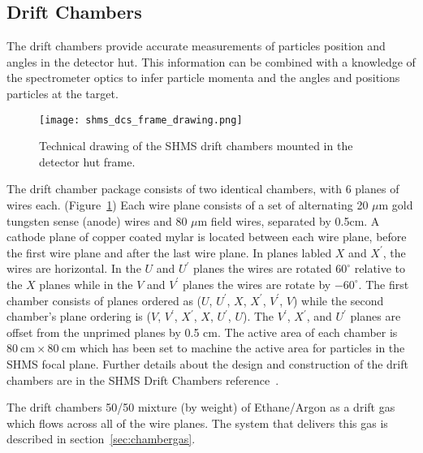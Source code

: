 

\subsection{Drift Chambers}
\label{sec:shmschambers}
The drift chambers provide accurate measurements of particles position
and angles in the detector hut.  This information can be combined with
a knowledge of the spectrometer optics to infer particle momenta and
the angles and positions particles at the target.

\begin{figure}[htb]
\begin{center}
\texttt{[image: shms\_dcs\_frame\_drawing.png]}
\caption{\label{chamberpair}Technical drawing of the SHMS drift
  chambers mounted in the detector hut frame.}
\end{center}
\end{figure}

The drift chamber package consists of two identical chambers, with 6 planes
of wires each.  (Figure~\ref{chamberpair})  Each wire plane consists
of a set of alternating 20 
$\mu\textrm{m}$ gold tungsten sense (anode) wires and 80 $\mu\textrm{m}$ field
wires, separated by 0.5cm.  A cathode plane of copper coated mylar is
located between each wire plane, before the first wire plane and after
the last wire plane.
In planes labled $X$ and $X^{\prime}$, the
wires are horizontal.  In the $U$ and $U^{\prime}$ planes the wires
are rotated $60^{\circ}$ relative to the $X$ planes while in the $V$
and $V^{\prime}$ planes the wires are rotate by $-60^{\circ}$.  The
first chamber consists of planes ordered as ($U$, $U^{\prime}$, $X$,
$X^{\prime}$, $V^{\prime}$, $V$) while the second chamber's plane
ordering is ($V$, $V^{\prime}$, $X^{\prime}$, $X$, $U^{\prime}$,
$U$).  The $V^{\prime}$, $X^{\prime}$, and $U^{\prime}$ planes are
offset from the unprimed planes by 0.5 cm.  The active area of each
chamber is $80~\textrm{cm}\times 80~\textrm{cm}$ which has been set to
machine the active area for particles in the SHMS focal plane.
Further details about the design and construction of the drift
chambers are in the SHMS Drift Chambers
reference~\cite{howto:shms_drift_chambers}.

The drift chambers 50/50 mixture (by weight) of Ethane/Argon as a
drift gas which
flows across all of the wire planes.  The system that delivers this
gas is described in section~\ref{sec:chambergas}.

